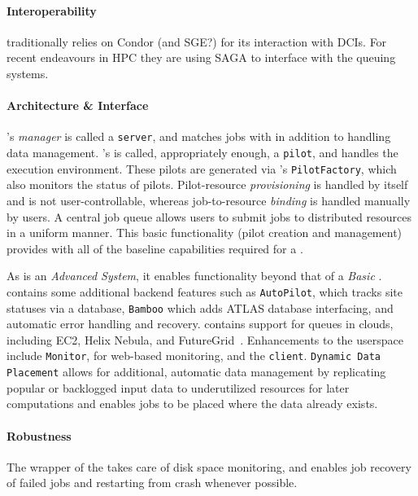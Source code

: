 \documentclass{sig-alternate}
\begin{document}
\paragraph{Interoperability}
\panda traditionally relies on Condor (and SGE?) for its interaction with DCIs.
For recent endeavours in HPC they are using SAGA to interface with the queuing
systems.

\paragraph{Architecture \& Interface}
\panda's \textit{manager} is called a \texttt{\panda server}, and matches
jobs with \pilots in addition to handling data management.
\panda's \textit{\pilot}
is called, appropriately enough, a \texttt{pilot}, and handles the execution
environment.  These pilots are generated via \panda's \texttt{PilotFactory},
which also monitors the status of pilots.
Pilot-resource \textit{provisioning} is handled by \panda itself and is not
user-controllable, whereas job-to-resource \textit{binding} is handled
manually by users.
A central job queue allows users to submit jobs
to distributed resources in a uniform manner.
This basic functionality (pilot creation and management) provides \panda with
all of the baseline capabilities required for a \pilotjob.

As \panda is an \textit{Advanced \pilotjob System}, it enables functionality
beyond that of a \textit{Basic \pilotjob}.
\panda contains some additional backend features such as \texttt{AutoPilot},
which tracks site statuses via a database, \texttt{Bamboo} which adds ATLAS
database interfacing, and automatic error handling and recovery.
\panda contains support for queues in clouds, including EC2, Helix Nebula, and
FutureGrid~\cite{pandapresentation2013-06}.
Enhancements to the userspace include \texttt{Monitor}, for web-based
monitoring, and the \texttt{\panda client}.  \texttt{\panda Dynamic Data
Placement} \cite{maeno_pd2p:_2012} allows for additional, automatic data
management by replicating popular or backlogged input data to underutilized
resources for later computations and enables jobs to be placed where the data
already exists.

\paragraph{Robustness}
The wrapper of the \pilot takes care of disk space monitoring, and enables job
recovery of failed jobs and restarting from crash whenever possible.
\end{document}
